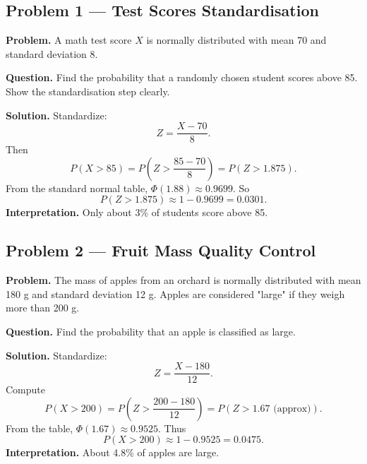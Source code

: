 	
	\begin{ExamProblems}
		
		\hypertarget{c6-ex1}{}
		\item
		\subsection*{Problem 1 — Test Scores Standardisation}
		
		\textbf{Problem.}
		A math test score \(X\) is normally distributed with mean 70 and standard deviation 8.
		
		\textbf{Question.} Find the probability that a randomly chosen student scores above 85.
		Show the standardisation step clearly.
		
		\textbf{Solution.}
		Standardize:
		\[
		Z=\frac{X-70}{8}.
		\]
		Then
		\[
		P(X>85)=P\left(Z>\frac{85-70}{8}\right)=P(Z>1.875).
		\]
		From the standard normal table, \(\Phi(1.88)\approx 0.9699\).
		So
		\[
		P(Z>1.875)\approx 1-0.9699=0.0301.
		\]
		\textbf{Interpretation.} Only about 3\% of students score above 85.
		
		
		\hypertarget{c6-ex2}{}
		\item
		\subsection*{Problem 2 — Fruit Mass Quality Control}
		
		\textbf{Problem.}
		The mass of apples from an orchard is normally distributed with mean 180 g
		and standard deviation 12 g. Apples are considered "large" if they weigh more than 200 g.
		
		\textbf{Question.} Find the probability that an apple is classified as large.
		
		\textbf{Solution.}
		Standardize:
		\[
		Z=\frac{X-180}{12}.
		\]
		Compute
		\[
		P(X>200)=P\left(Z>\frac{200-180}{12}\right)=P(Z>1.67\text{ (approx)}).
		\]
		From the table, \(\Phi(1.67)\approx 0.9525\).
		Thus
		\[
		P(X>200)\approx 1-0.9525=0.0475.
		\]
		\textbf{Interpretation.} About 4.8\% of apples are large.
		
	\end{ExamProblems}
	
	
